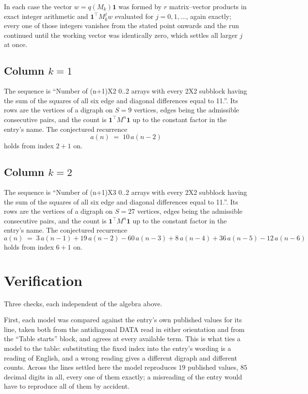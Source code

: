 \documentclass[11pt,a4paper]{article}
\theoremstyle{plain}
\theoremstyle{definition}
\begin{document}
In each case the vector $w=q(M_k)\mathbf{1}$ was formed by $r$ matrix--vector products in
exact integer arithmetic and $\mathbf{1}^{\!\top}M_k^{j}w$ evaluated for $j=0,1,\dots$,
again exactly; every one of those integers vanishes from the stated point onwards and the run
continued until the working vector was identically zero, which settles all larger $j$ at once.

\subsection*{Column $k$$=1$}
The sequence is ``Number of (n+1)X2 0..2 arrays with every 2X2 subblock having the sum of the squares of all six edge and diagonal differences equal to 11.''. Its rows are the vertices of a digraph on
$S=9$ vertices, edges being the admissible consecutive pairs, and the count is
$\mathbf{1}^{\!\top}M^{n}\mathbf{1}$ up to the constant factor in the entry's name.
The conjectured recurrence
\[
a(n)\;=\;10\,a(n-2)
\]
holds from index $2+1$ on.

\subsection*{Column $k$$=2$}
The sequence is ``Number of (n+1)X3 0..2 arrays with every 2X2 subblock having the sum of the squares of all six edge and diagonal differences equal to 11.''. Its rows are the vertices of a digraph on
$S=27$ vertices, edges being the admissible consecutive pairs, and the count is
$\mathbf{1}^{\!\top}M^{n}\mathbf{1}$ up to the constant factor in the entry's name.
The conjectured recurrence
\[
a(n)\;=\;3\,a(n-1) + 19\,a(n-2) - 60\,a(n-3) + 8\,a(n-4) + 36\,a(n-5) - 12\,a(n-6)
\]
holds from index $6+1$ on.

\section{Verification}

Three checks, each independent of the algebra above.

First, each model was compared against the entry's own published values for its line, taken
both from the antidiagonal DATA read in either orientation and from the ``Table starts''
block, and agrees at every available term. This is what ties a model to the table:
substituting the fixed index into the entry's wording is a reading of English, and a wrong
reading gives a different digraph and different counts. Across the lines settled here the
model reproduces $19$ published values, $85$ decimal digits in all, every one of
them exactly; a misreading of the entry would have to reproduce all of them by accident.
\end{document}
